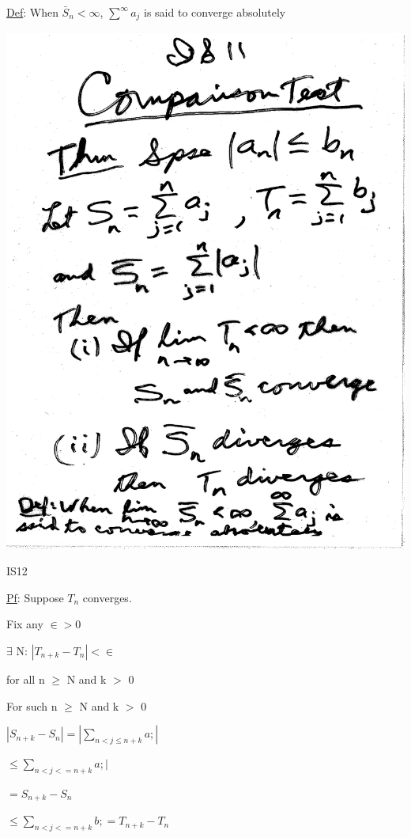 \documentclass[10pt,a4paper]{article}
\begin{document}
\underline{Def}: 
When $\bar{S}_n < \infty$, $\sum_{}^{\infty}a_j$ is said to converge absolutely

\includegraphics[scale=.5]{Pages/IS_11}

\newpage

\begin{center}
IS12
\end{center}

\underline{Pf}: 
Suppose $T_n$ converges.
 
Fix any $\in > 0$ 

$\exists$ N: $|T_{n+k}-T_n|<\in$ 

    for all n $\ge$ N and k $>$ 0

For such n $\ge$ N and k $>$ 0

$|S_{n+k}-S_n|=|\sum_{n<j \le n+k}^{} a;|$

$\le \sum_{n<j<=n+k}^{} a;|$

$= S_{n+k} - S_n$

$\le \sum_{n<j<=n+k}^{} b;=T_{n+k}-T_n$
\end{document}
